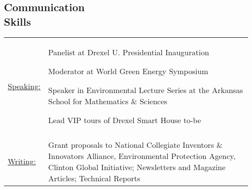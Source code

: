 \documentclass[margin]{res}
\begin{document}
\begin{resume}
\begin{educate}
\section{Communication \\ Skills}
   \begin{tabular}{l p{3in}}
    \underline{Speaking:} & \vspace{-3.5mm}
    \begin{list}{}{\leftmargin=1em} \itemsep -2pt %
	\item Panelist at Drexel U. Presidential Inauguration
	\item Moderator at World Green Energy Symposium
	\item Speaker in Environmental Lecture Series at the Arkansas School for Mathematics \& Sciences
	\item Lead VIP tours of Drexel Smart House to-be
	\end{list} \\\\
     \underline{Writing:} & Grant proposals to National Collegiate Inventors \& Innovators Alliance, Environmental Protection Agency, Clinton Global Initiative; Newsletters and Magazine Articles; Technical Reports 
 \end{tabular}
\end{educate}
 


\end{resume}
\end{document}
